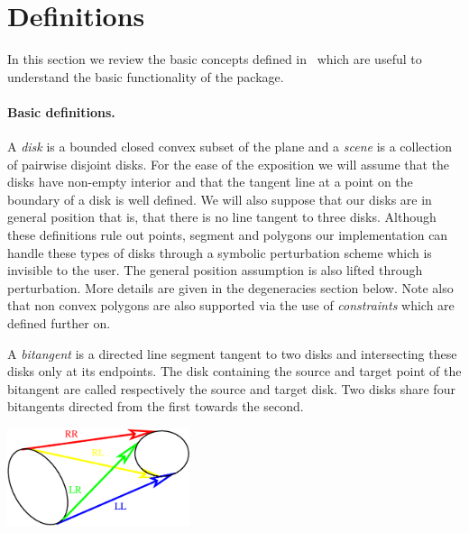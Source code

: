 \section{Definitions}
In this section we review the basic concepts defined in~\cite{G-ap-sstvc-01}
which are useful to understand the basic functionality of the package.

\paragraph{Basic definitions. }
A \emph{disk} is a bounded closed convex subset of the plane and a \emph{scene}
is a collection of pairwise disjoint disks. For the ease of the exposition we
will assume that the disks have non-empty interior and that the tangent line at
a point on the boundary of a disk is well defined. We will also suppose that our
disks are in general position that is, that there is no line tangent to three
disks. Although these definitions rule out points, segment and polygons our
implementation can handle these types of disks through a symbolic perturbation
scheme which is invisible to the user.  The general position assumption is also
lifted through perturbation.  More details are given in the degeneracies section
below. Note also that non convex polygons are also supported via the use of
\emph{constraints} which are defined further on.

A \emph{bitangent} is a directed line segment tangent to two disks and
intersecting these disks only at its endpoints.  The disk containing the source
and target point of the bitangent are called respectively the source and target
disk.  Two disks share four bitangents directed from the first towards the
second. 

\begin{ccTexOnly}
    \begin{center}
      \parbox{0.4\textwidth}{%
          \includegraphics[width=0.4\textwidth]{fig/bitangent.eps}%
      }
    \end{center}
\end{ccTexOnly}

